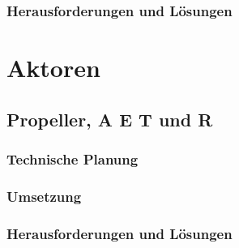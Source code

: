   \subsection{Herausforderungen und Lösungen}

\chapter{Aktoren}
\renewcommand{\kapitelautor}{Autor: Lucas Ullrich}

\section{Propeller, A E T und R}

  \subsection{Technische Planung}

  \subsection{Umsetzung}

  \subsection{Herausforderungen und Lösungen}
